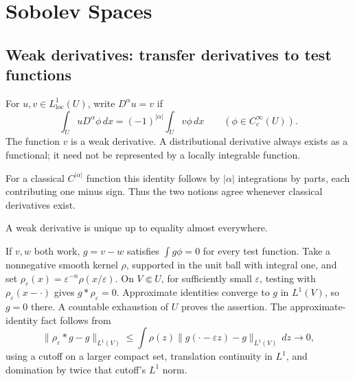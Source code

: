 \section{Sobolev Spaces}
\label{sec:5-2}

\subsection{Weak derivatives: transfer derivatives to test functions}
\begin{definition}[Evans \S5.2.1]
For $u,v\in L^1_{\mathrm{loc}}(U)$, write $D^\alpha u=v$ if
\[
 \int_U uD^\alpha\phi\,dx
 =(-1)^{|\alpha|}\int_U v\phi\,dx
 \qquad(\phi\in C_c^\infty(U)).
\]
The function $v$ is a weak derivative. A distributional derivative always
exists as a functional; it need not be represented by a locally integrable
function.
\end{definition}
\Needspace{45mm}
For a classical $C^{|\alpha|}$ function this identity follows by
$|\alpha|$ integrations by parts, each contributing one minus sign.
Thus the two notions agree whenever classical derivatives exist.

\begin{lemma}
A weak derivative is unique up to equality almost everywhere.
\end{lemma}
\begin{expandedproof}
If $v,w$ both work, $g=v-w$ satisfies $\int g\phi=0$ for every test
function. Take a nonnegative smooth kernel $\rho$, supported in the unit
ball with integral one, and set
$\rho_\varepsilon(x)=\varepsilon^{-n}\rho(x/\varepsilon)$.
On $V\Subset U$, for sufficiently small $\varepsilon$, testing with
$\rho_\varepsilon(x-\cdot)$ gives $g*\rho_\varepsilon=0$.
Approximate identities converge to $g$ in $L^1(V)$, so $g=0$ there.
A countable exhaustion of $U$ proves the assertion.
The approximate-identity fact follows from
\[
 \|\rho_\varepsilon*g-g\|_{L^1(V)}
 \leq\int\rho(z)\|g(\cdot-\varepsilon z)-g\|_{L^1(V)}\,dz\to0,
\]
using a cutoff on a larger compact set, translation continuity in $L^1$,
and domination by twice that cutoff's $L^1$ norm.
\end{expandedproof}

